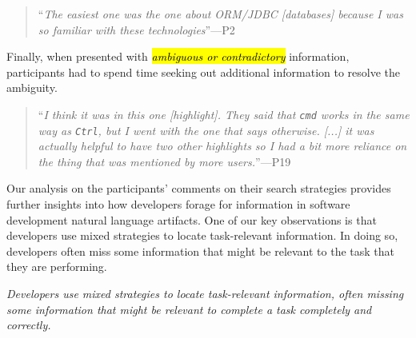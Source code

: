 \smallskip
\begin{quote}
    ``\textit{The easiest one was the one about ORM/JDBC [databases] because I was so familiar with these technologies}''---P2
\end{quote}




Finally, when presented with \hl{\textit{ambiguous or contradictory}} information, participants had to spend time seeking out additional information to resolve the ambiguity.


\smallskip
\begin{quote}
    ``\textit{I think it was in this one [highlight]. They said that \texttt{cmd} works in the same way as \texttt{Ctrl}, but I went with the one that says otherwise. [...] it was actually helpful to have two other highlights so I had a bit more reliance on the thing that was mentioned by more users.}''---P19
\end{quote}



Our analysis on the participants' comments on their search strategies provides further insights into how developers forage for information in software development natural language artifacts. One of our key observations is that  developers use mixed strategies to locate task-relevant information. In doing so, developers often miss some information that might be relevant to the task that they are performing.


\medskip
\begin{bluequote}
    \textit{Developers use mixed strategies to locate task-relevant information, often missing some information that might be relevant to complete a task completely and correctly.}
\end{bluequote}

